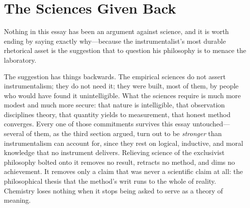 \section{The Sciences Given Back}

Nothing in this essay has been an argument against science, and it is worth ending by saying exactly why---because the instrumentalist's most durable rhetorical asset is the suggestion that to question his philosophy is to menace the laboratory.

The suggestion has things backwards. The empirical sciences do not assert instrumentalism; they do not need it; they were built, most of them, by people who would have found it unintelligible. What the sciences require is much more modest and much more secure: that nature is intelligible, that observation disciplines theory, that quantity yields to measurement, that honest method converges. Every one of those commitments survives this essay untouched---several of them, as the third section argued, turn out to be \emph{stronger} than instrumentalism can account for, since they rest on logical, inductive, and moral knowledge that no instrument delivers. Relieving science of the exclusivist philosophy bolted onto it removes no result, retracts no method, and dims no achievement. It removes only a claim that was never a scientific claim at all: the philosophical thesis that the method's writ runs to the whole of reality. Chemistry loses nothing when it stops being asked to serve as a theory of meaning.

